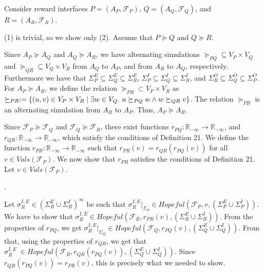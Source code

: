 \documentclass[10pt,a4paper]{article}
\begin{document}
 
 
Consider reward interfaces $P=(A_{P},\mathcal{F}_{P})$, $Q=(A_{Q},\mathcal{F}_{Q})$, and $R=(A_{R},\mathcal{F}_{R})$.\par
 
 
 
(1) is trivial, so we show only (2). Assume that $P\succeq Q$ and $Q\succeq R$.\par
 
 
 
Since $A_{P}\succeq A_{Q}$ and $A_{Q}\succeq A_{R}$, we have alternating simulations $\succeq_{PQ}\subseteq V_{P}\times V_{Q}$ and $\succeq_{QR}\subseteq V_{Q}\times V_{R}$ from $A_{Q}$ to $A_{P}$, and from $A_{R}$ to $A_{Q}$, respectively. Furthermore we have that $\Sigma_{P}^{E}\subseteq\Sigma_{Q}^{E}\subseteq\Sigma_{R}^{E}$, $\Sigma_{P}^{I}\subseteq\Sigma_{Q}^{I}\subseteq\Sigma_{R}^{I}$, and $\Sigma_{R}^{O}\subseteq\Sigma_{Q}^{O}\subseteq\Sigma_{P}^{O}$. For $A_{P}\succeq A_{R}$, we define the relation $\succeq_{PR}\subset V_{P}\times V_{R}$ as $\succeq_{PR}:=\{(u,v)\in V_{P}\times V_{R}\mid\exists w\in V_{Q}.\nobreak\ u\succeq_{PQ}w\land w\succeq_{QR}v\}$. The relation $\succeq_{PR}$ is an alternating simulation from $A_{R}$ to $A_{P}$. Thus, $A_{P}\succeq A_{R}$.\par
 
 
 
Since $\mathcal{F}_{P}\succeq\mathcal{F}_{Q}$ and $\mathcal{F}_{Q}\succeq\mathcal{F}_{R}$, there exist functions $r_{PQ}:\mathbb{R}_{-\infty}\to\mathbb{R}_{-\infty}$, and $r_{QR}:\mathbb{R}_{-\infty}\to\mathbb{R}_{-\infty}$, which satisfy the conditions of Definition 21. We define the function $r_{PR}:\mathbb{R}_{-\infty}\to\mathbb{R}_{-\infty}$ such that $r_{PR}(v)=r_{QR}(r_{PQ}(v))$ for all $v\in\mathit{Vals}(\mathcal{F}_{P})$. We now show that $r_{PR}$ satisfies the conditions of Definition 21. Let $v\in\mathit{Vals}(\mathcal{F}_{P})$.\par
  
\par{}. 
 
Let $\sigma_{R}^{I,E}\in(\Sigma_{R}^{E}\cup\Sigma_{R}^{I})^{\infty}$ be such that $\sigma_{R}^{I,E}|_{\Sigma_{P}}\in\mathit{Hopeful}(\mathcal{F}_{P},v,(\Sigma_{P}^{E}\cup\Sigma_{P}^{I}))$. We have to show that $\sigma_{R}^{I,E}\in\mathit{Hopeful}(\mathcal{F}_{R},r_{PR}(v),(\Sigma_{R}^{E}\cup\Sigma_{R}^{I}))$. From the properties of $r_{PQ}$, we get $\sigma_{R}^{I,E}|_{\Sigma_{Q}}\in\mathit{Hopeful}(\mathcal{F}_{Q},r_{PQ}(v),(\Sigma_{Q}^{E}\cup\Sigma_{Q}^{I}))$. From that, using the properties of $r_{QR}$, we get that $\sigma_{R}^{I,E}\ \in\mathit{Hopeful}(\mathcal{F}_{R},r_{QR}(r_{PQ}(v)),(\Sigma_{Q}^{E}\cup\Sigma_{Q}^{I}))$. Since $r_{QR}(r_{PQ}(v))=r_{PR}(v)$, this is precisely what we needed to show.\par
 
\end{document}
